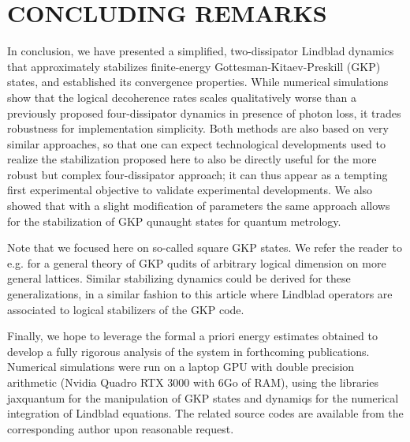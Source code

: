 \documentclass[a4paper, 11pt]{article}
\begin{document}
\section{CONCLUDING REMARKS}
\label{sec-concl}
In conclusion, we have presented a simplified, two-dissipator Lindblad dynamics that approximately stabilizes finite-energy Gottesman-Kitaev-Preskill (GKP) states, and established its convergence properties. While numerical simulations show that the logical decoherence rates scales qualitatively worse than a previously proposed four-dissipator dynamics in presence of photon loss, it trades robustness for implementation simplicity. Both methods are also based on very similar approaches, so that one can expect technological developments used to realize the stabilization proposed here to also be directly useful for the more robust but complex four-dissipator approach; it can thus appear as a tempting first experimental objective to validate experimental developments.
We also showed that with a slight modification of parameters the same approach allows for the stabilization of GKP qunaught states for quantum metrology.

Note that we focused here on so-called square GKP states. We refer the reader to e.g. \cite{conrad2022gottesman,royerEncodingQubitsMultimode2022a} for a general theory of GKP qudits of arbitrary logical dimension on more general lattices. Similar stabilizing dynamics could be derived for these generalizations, in a similar fashion to this article where Lindblad operators are associated to logical stabilizers of the GKP code.

Finally, we hope to leverage the formal a priori energy estimates
obtained to develop a fully rigorous analysis of the system in
forthcoming publications.\\

Numerical simulations were run on a laptop GPU with double precision arithmetic (Nvidia Quadro RTX 3000 with 6Go of RAM), using the libraries jaxquantum \cite{jha2025jaxquantum} for the manipulation of GKP states and dynamiqs \cite{guilmin2025dynamiqs} for the numerical integration of Lindblad equations. The related source codes are available from  the corresponding author upon reasonable request.

\end{document}
